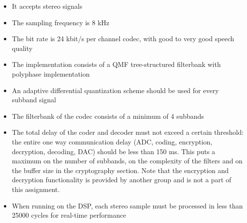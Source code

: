 \documentclass[a4paper]{article}
\begin{document}
\begin{itemize}
\item It accepts stereo signals
\item The sampling frequency is 8 kHz
\item The bit rate is 24 kbit/s per channel codec, with good to very good speech quality
\item The implementation consists of a QMF tree-structured filterbank with polyphase implementation
\item An adaptive differential quantization scheme should be used for every subband signal
\item The filterbank of the codec consists of a minimum of 4 subbands
\item The total delay of the coder and decoder must not exceed a certain threshold: the entire one way communication delay (ADC, coding, encryption, decryption, decoding, DAC) should be less than 150 ms. This puts a maximum on the number of subbands, on the complexity of the filters and on the buffer size in the cryptography section. Note that the encryption and decryption functionality is provided by another group and is not a part of this assignment.
\item When running on the DSP, each stereo sample must be processed in less than 25000 cycles for real-time performance

\end{itemize}
\end{document}
